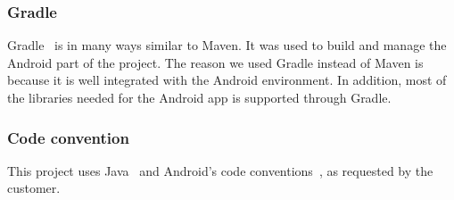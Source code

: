 \subsubsection{Gradle}
Gradle~\cite{gradle} is in many ways similar to Maven. It was used to build and manage the Android part of the project. The reason we used Gradle instead of Maven is because it is well integrated with the Android environment. In addition, most of the libraries needed for the Android app is supported through Gradle.

\subsubsection{Code convention}
This project uses Java~\cite{javaconv} and Android's code conventions~\cite{androidconv}, as requested by the customer.
